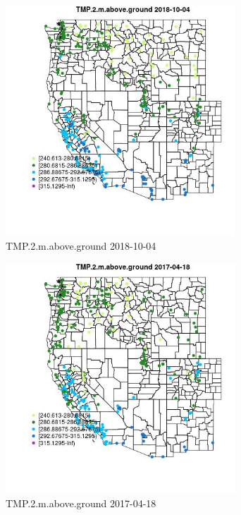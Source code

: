 \begin{figure} 
\centering  
\includegraphics[width=0.77\textwidth]{Code_Outputs/Report_ML_input_PM25_Step4_part_f_de_duplicated_aveswNAs_MapObsTMP2maboveground2018-10-04.jpg} 
\caption{\label{fig:Report_ML_input_PM25_Step4_part_f_de_duplicated_aveswNAsMapObsTMP2maboveground2018-10-04}TMP.2.m.above.ground 2018-10-04} 
\end{figure} 
 

\begin{figure} 
\centering  
\includegraphics[width=0.77\textwidth]{Code_Outputs/Report_ML_input_PM25_Step4_part_f_de_duplicated_aveswNAs_MapObsTMP2maboveground2017-04-18.jpg} 
\caption{\label{fig:Report_ML_input_PM25_Step4_part_f_de_duplicated_aveswNAsMapObsTMP2maboveground2017-04-18}TMP.2.m.above.ground 2017-04-18} 
\end{figure} 
 

